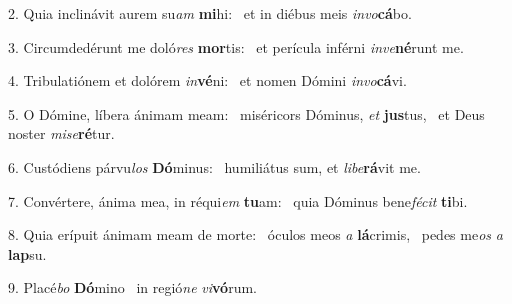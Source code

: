 2. Quia inclinávit aurem su\textit{am} \textbf{mi}hi: \ast\  et in diébus meis \textit{in}\textit{vo}\textbf{cá}bo.\

3. Circumdedérunt me doló\textit{res} \textbf{mor}tis: \ast\  et perícula inférni \textit{in}\textit{ve}\textbf{né}runt me.\

4. Tribulatiónem et dolórem \textit{in}\textbf{vé}ni: \ast\  et nomen Dómini \textit{in}\textit{vo}\textbf{cá}vi.\

5. O Dómine, líbera ánimam meam: \dag\  miséricors Dóminus, \textit{et} \textbf{jus}tus, \ast\  et Deus noster \textit{mi}\textit{se}\textbf{ré}tur.\

6. Custódiens párvu\textit{los} \textbf{Dó}minus: \ast\  humiliátus sum, et \textit{li}\textit{be}\textbf{rá}vit me.\

7. Convértere, ánima mea, in réqui\textit{em} \textbf{tu}am: \ast\  quia Dóminus bene\textit{fé}\textit{cit} \textbf{ti}bi.\

8. Quia erípuit ánimam meam de morte: \dag\  óculos meos \textit{a} \textbf{lá}crimis, \ast\  pedes me\textit{os} \textit{a} \textbf{lap}su.\

9. Placé\textit{bo} \textbf{Dó}mino \ast\  in regió\textit{ne} \textit{vi}\textbf{vó}rum.\

